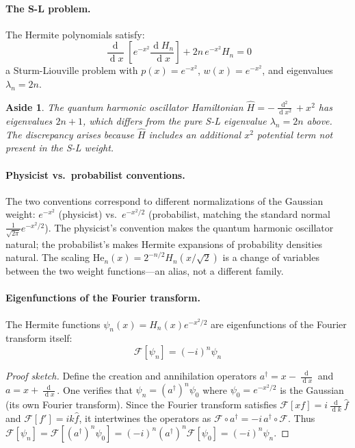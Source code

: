 \documentclass[12pt,a4paper]{report}
\DeclareMathOperator{\deriv}{d}
\theoremstyle{thms}
\newtheorem{aside}{Aside}[section]
\theoremstyle{defns}
\begin{document}
\paragraph{The S-L problem.} The Hermite polynomials satisfy:
\begin{equation}
    \dfrac{\deriv}{\deriv x}\left[e^{-x^2}\dfrac{\deriv H_n}{\deriv x}\right] + 2n\,e^{-x^2}H_n = 0
\end{equation}
a Sturm-Liouville problem with $p(x) = e^{-x^2}$, $w(x) = e^{-x^2}$, and eigenvalues $\lambda_n = 2n$.

\begin{aside}
    The quantum harmonic oscillator Hamiltonian $\hat{H} = -\frac{\deriv^2}{\deriv x^2} + x^2$ has eigenvalues $2n + 1$, which differs from the pure S-L eigenvalue $\lambda_n = 2n$ above. The discrepancy arises because $\hat{H}$ includes an additional $x^2$ potential term not present in the S-L weight.
\end{aside}

\paragraph{Physicist vs.\ probabilist conventions.} The two conventions correspond to different normalizations of the Gaussian weight: $e^{-x^2}$ (physicist) vs.\ $e^{-x^2/2}$ (probabilist, matching the standard normal $\frac{1}{\sqrt{2\pi}}e^{-x^2/2}$). The physicist's convention makes the quantum harmonic oscillator natural; the probabilist's makes Hermite expansions of probability densities natural. The scaling $\mathrm{He}_n(x) = 2^{-n/2}H_n(x/\sqrt{2})$ is a change of variables between the two weight functions—an alias, not a different family.

\paragraph{Eigenfunctions of the Fourier transform.} The Hermite functions $\psi_n(x) = H_n(x)e^{-x^2/2}$ are eigenfunctions of the Fourier transform itself:
\begin{equation}
    \mathcal{F}[\psi_n] = (-i)^n \psi_n
    \label{eq:hermite_ft_eigen}
\end{equation}

\begin{proof}[Proof sketch]
    Define the creation and annihilation operators $a^\dagger = x - \frac{\deriv}{\deriv x}$ and $a = x + \frac{\deriv}{\deriv x}$. One verifies that $\psi_n = (a^\dagger)^n \psi_0$ where $\psi_0 = e^{-x^2/2}$ is the Gaussian (its own Fourier transform). Since the Fourier transform satisfies $\mathcal{F}[xf] = i\frac{\deriv}{\deriv k}\hat{f}$ and $\mathcal{F}[f'] = ik\hat{f}$, it intertwines the operators as $\mathcal{F} \circ a^\dagger = -i\,a^\dagger \circ \mathcal{F}$. Thus $\mathcal{F}[\psi_n] = \mathcal{F}[(a^\dagger)^n \psi_0] = (-i)^n (a^\dagger)^n \mathcal{F}[\psi_0] = (-i)^n \psi_n$.
\end{proof}
\end{document}
